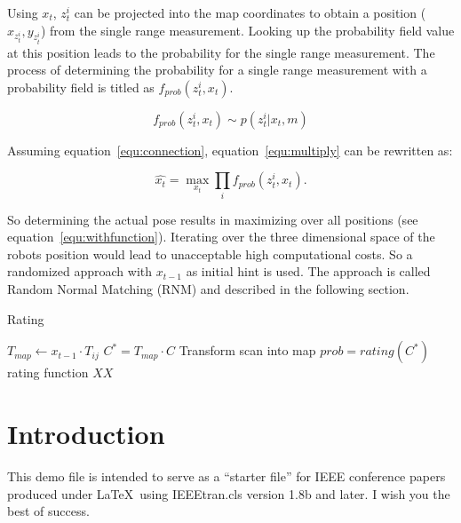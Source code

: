 \documentclass[conference]{IEEEtran}
\begin{document}
Using $x_t$, $z^i_t$ can be projected into the map coordinates to obtain a position ($x_{z^i_t}, y_{z^i_t}$) from the single range measurement. Looking up the probability field value at this position leads to the probability for the single range measurement. The process of determining the probability for a single range measurement with a probability field is titled as $f_{prob}(z^i_t, x_t)$.

\begin{equation}
\label{equ:connection}
f_{prob}(z^i_t, x_t) \sim p \left ( z^i_t|x_t,m \right )
\end{equation}

\noindent Assuming equation~\ref{equ:connection}, equation~\ref{equ:multiply} can be rewritten as:

\begin{equation}
\label{equ:withfunction}
	\widehat{x_t} = \max_{x_t} \prod_i f_{prob}(z^i_t, x_t).
\end{equation}

So determining the actual pose results in maximizing over all positions (see equation~\ref{equ:withfunction}). Iterating over the three dimensional space of the robots position would lead to unacceptable high computational costs. So a randomized approach with $x_{t-1}$ as initial hint is used. The approach is called Random Normal Matching (RNM) and described in the following section.       

\begin{algorithm}
	\caption{Rating}
	\label{alg:rating}
	\begin{algorithmic}[1]
		\State $T_{map} \gets x_{t-1} \cdot T_{ij}$
		\State $C^* = T_{map} \cdot C $ \Comment Transform scan into map
		\State $prob = rating(C^*)$ \Comment rating function
		\State \Return $XX$
		\EndFunction
	\end{algorithmic}
\end{algorithm}

\section{Introduction}
This demo file is intended to serve as a ``starter file''
for IEEE conference papers produced under \LaTeX\ using
IEEEtran.cls version 1.8b and later.
I wish you the best of success.
\end{document}
